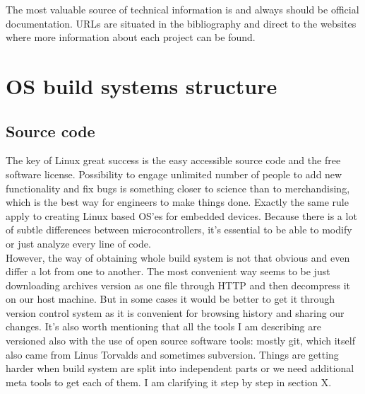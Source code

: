 \documentclass[printmode]{mgr}
\begin{document}
The most valuable source of technical information is and always should be official documentation. URLs are situated in the bibliography and direct to the websites where more information about each project can be found.



\section{OS build systems structure}





\subsection{Source code}

The key of Linux great success is the easy accessible source code and the free software license. Possibility to engage unlimited number of people to add new functionality and fix bugs is something closer to science than to merchandising, which is the best way for engineers to make things done. Exactly the same rule apply to creating Linux based OS'es for embedded devices. Because there is a lot of subtle differences between microcontrollers, it's essential to be able to modify or just analyze every line of code. \\

However, the way of obtaining whole build system is not that obvious and even differ a lot from one to another. The most convenient way seems to be just downloading archives version as one file through HTTP and then decompress it on our host machine. But in some cases it would be better to get it through version control system as it is convenient for browsing history and sharing our changes. It's also worth mentioning that all the tools I am describing are versioned also with the use of open source software tools: mostly git, which itself also came from Linus Torvalds and sometimes subversion. Things are getting harder when build system are split into independent parts or we need additional meta tools to get each of them. I am clarifying it step by step in section X. %
\end{document}
